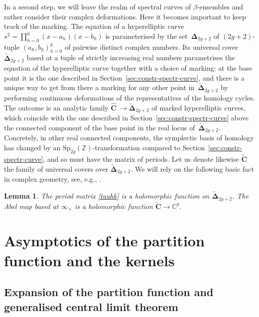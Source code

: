 \documentclass[pdftex]{sigma}
\numberwithin{equation}{section}
\newtheorem{Lemma}[Theorem]{Lemma}
\begin{document}
In a second step, we will leave the realm of spectral curves of
$\beta$-ensembles and rather consider their complex deformations. Here it becomes important to keep track of the marking.
The equation of a hyperelliptic curve $s^2 = \prod_{h = 0}^{g} (x - a_h)(x - b_h)$ is parameterised by the set~$\bm{\Delta}_{2g + 2}$ of $(2g + 2)$-tuple $(a_h,b_h)_{h = 0}^{g}$ of pairwise distinct complex numbers. Its universal cover~$\widetilde{\bm{\Delta}}_{2g + 2}$ based at a tuple of strictly increasing real numbers parametrises the equation of the hyperelliptic curve together with a choice of marking: at the base point it is the one described in Section~\ref{sec:constr-spectr-curve}, and there is a unique way to get from there a marking for any other point in~$\widetilde{\bm{\Delta}}_{2g + 2}$ by performing continuous deformations of the representatives of the homology cycles. The outcome is an analytic family $\hat{\bm{C}}~\rightarrow \widetilde{\bm{\Delta}}_{2g + 2}$ of marked hyperelliptic curves, which coincide with the one described in Section~\ref{sec:constr-spectr-curve} above the connected component of the base point in the real locus of~$\widetilde{\bm{\Delta}}_{2g + 2}$. Concretely, in other real connected components, the symplectic basis of homology has changed by an $\text{Sp}_{2g}(\mathbb{Z})$-transformation compared to Section~\ref{sec:constr-spectr-curve}, and so must have the matrix of periods. Let us denote likewise $\widetilde{\bm{C}}$ the family of universal covers over $\widetilde{\bm{\Delta}}_{2g + 2}$. We will rely on the following basic fact in complex geometry, see, e.g., \cite[Chapter
1]{period-book}.
\begin{Lemma}\label{lem:holo-periods}
 The period matrix \eqref{tauhk} is a holomorphic function on $\widetilde{\bm{\Delta}}_{2g + 2}$. The Abel map based at $\infty_+$ is a holomorphic function $\widetilde{\bm{C}} \rightarrow \mathbb{C}^{g}$.
\end{Lemma}



\section{Asymptotics of the partition function and the kernels}

\label{sec:expans-part}
\subsection{Expansion of the partition function and generalised central limit theorem}
\label{sec:expans-part-funct}
\end{document}
